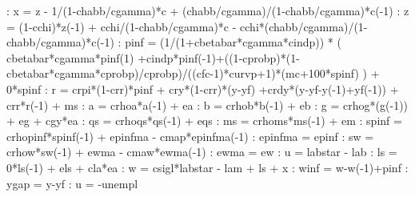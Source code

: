 \documentclass{article}%
\begin{document}
   :  x = z {-} 1/(1{-}chabb/cgamma)*c + (chabb/cgamma)/(1{-}chabb/cgamma)*c({-}1)\newline%
   :  z = (1{-}cchi)*z({-}1) + cchi/(1{-}chabb/cgamma)*c {-} cchi*(chabb/cgamma)/(1{-}chabb/cgamma)*c({-}1)\newline%
   :  pinf =  (1/(1+cbetabar*cgamma*cindp)) * ( cbetabar*cgamma*pinf(1) +cindp*pinf({-}1)+((1{-}cprobp)*(1{-}cbetabar*cgamma*cprobp)/cprobp)/((cfc{-}1)*curvp+1)*(mc+100*spinf)  )  + 0*spinf\newline%
   :  r =  crpi*(1{-}crr)*pinf + cry*(1{-}crr)*(y{-}yf) +crdy*(y{-}yf{-}y({-}1)+yf({-}1)) + crr*r({-}1) + ms\newline%
   :  a = crhoa*a({-}1)  + ea\newline%
   :  b = crhob*b({-}1) + eb\newline%
   :  g = crhog*(g({-}1)) + eg + cgy*ea\newline%
   :  qs = crhoqs*qs({-}1) + eqs\newline%
   :  ms = crhoms*ms({-}1) + em\newline%
   :  spinf = crhopinf*spinf({-}1) + epinfma {-} cmap*epinfma({-}1)\newline%
   :  epinfma = epinf\newline%
   :  sw = crhow*sw({-}1) + ewma {-} cmaw*ewma({-}1)\newline%
   :  ewma = ew\newline%
   :  u = labstar {-} lab\newline%
   :  ls = 0*ls({-}1) + els + cla*ea\newline%
   :  w = csigl*labstar {-} lam + ls + x\newline%
   :  winf = w{-}w({-}1)+pinf\newline%
   :  ygap = y{-}yf\newline%
   :  u = {-}unempl\newline%
\end{document}
